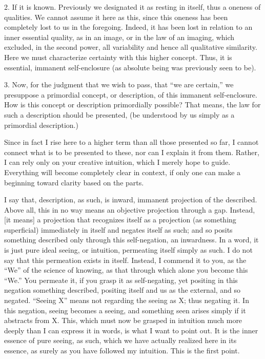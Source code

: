 2. If it is known.
Previously we designated it as resting in itself,
thus a oneness of qualities.
We cannot assume it here as this,
since this oneness has been
completely lost to us in the foregoing.
Indeed, it has been lost in relation to
an inner essential quality, as in an image,
or in the law of an imaging,
which excluded, in the second power,
all variability and hence all qualitative similarity.
Here we must characterize certainty with this higher concept.
Thus, it is essential, immanent self-enclosure
(as absolute being was previously seen to be).

3. Now, for the judgment
that we wish to pass,
that “we are certain,”
we presuppose a primordial concept, or description,
of this immanent self-enclosure.
How is this concept or description primordially possible?
That means, the law for such a description should be presented,
(be understood by us simply as a primordial description.)

Since in fact I rise here to a higher term
than all those presented so far,
I cannot connect what is to be presented to these,
nor can I explain it from them.
Rather, I can rely only on your creative intuition,
which I merely hope to guide.
Everything will become completely clear in context,
if only one can make a beginning toward clarity
based on the parts.

I say that, description, as such,
is inward, immanent projection of the described.
Above all, this in no way means
an objective projection through a gap.
Instead, [it means] a projection
that recognizes itself as a projection
(as something superficial)
immediately in itself
and negates itself as such;
and so posits something described
only through this self-negation,
an inwardness.
In a word, it is just pure ideal seeing,
or intuition, permeating itself simply as such.
I do not say that this permeation exists in itself.
Instead, I commend it to you,
as the “We” of the science of knowing,
as that through which alone you become this “We.”
You permeate it, if you grasp it as self-negating,
yet positing in this negation something described,
positing itself and us as the external, and so negated.
“Seeing X” means not regarding the seeing as X;
thus negating it.
In this negation, seeing becomes a seeing,
and something seen arises simply
if it abstracts from X.
This, which must now be grasped in intuition
much more deeply than I can express it in words,
is what I want to point out.
It is the inner essence of pure seeing, as such,
which we have actually realized here in its essence,
as surely as you have followed my intuition.
This is the first point.

